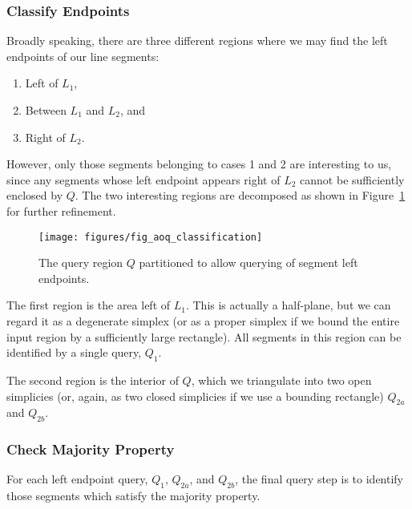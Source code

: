 \subsubsection{Classify Endpoints}
\label{:slabs:one:details:classify}

Broadly speaking, there are three different regions where we may find the left endpoints of our line segments:
\begin{enumerate}
 \item Left of $L_1$,
 \item Between $L_1$ and $L_2$, and
 \item Right of $L_2$.
\end{enumerate}

However, only those segments belonging to cases 1 and 2 are interesting to us, since any segments whose left endpoint appears right of $L_2$ cannot be sufficiently enclosed by $Q$. The two interesting regions are decomposed as shown in Figure~\ref{fig:slabs:one:classification} for further refinement.

\begin{figure}[t]
\begin{center}
  \texttt{[image: figures/fig\_aoq\_classification]}
  \caption{The query region $Q$ partitioned to allow querying of segment left endpoints.}
  \label{fig:slabs:one:classification}
\end{center}
\end{figure}

The first region is the area left of $L_1$. This is actually a half-plane, but we can regard it as a degenerate simplex (or as a proper simplex if we bound the entire input region by a sufficiently large rectangle). All segments in this region can be identified by a single query, $Q_1$.

The second region is the interior of $Q$, which we triangulate into two open simplicies (or, again, as two closed simplicies if we use a bounding rectangle) $Q_{2a}$ and $Q_{2b}$.


\subsubsection{Check Majority Property}
\label{:slabs:one:details:majority}

For each left endpoint query, $Q_1$, $Q_{2a}$, and $Q_{2b}$, the final query step is to identify those segments which satisfy the majority property.


